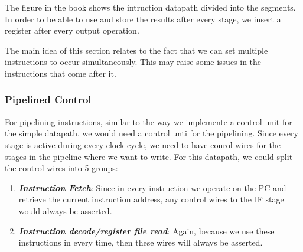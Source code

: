 \documentclass{article}
\begin{document}
The figure in the book shows the intruction datapath divided into the segments. In order to be
able to use and store the results after every stage, we insert a register after every output 
operation.

The main idea of this section relates to the fact that we can set multiple instructions to occur
simultaneously. This may raise some issues in the instructions that come after it.
\subsubsection{Pipelined Control}
For pipelining instructions, similar to the way we implemente a control unit for the simple 
datapath, we would need a control unti for the pipelining. Since every stage is active during 
every clock cycle, we need to have conrol wires for the stages in the pipeline where we want 
to write. For this datapath, we could split the control wires into 5 groups:
\begin{enumerate}
		\item{\textit{\textbf{Instruction Fetch}}}: Since in every instruction we operate on
				the PC and retrieve the current instruction address, any control wires to the IF
				stage would always be asserted.
		\item{\textbf{\textit{Instruction decode/register file read}}}: Again, because we use these
				instructions in every time, then these wires will always be asserted.
\end{enumerate}
\end{document}
